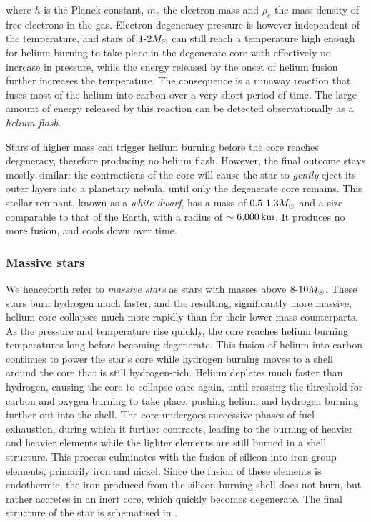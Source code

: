 where \(h\) is the Planck constant, \(m_e\) the electron mass and \(\rho_e\) the mass density of free electrons in the gas. Electron degeneracy pressure is however independent of the temperature, and stars of \(1\text{-}2M_{\odot}\) can still reach a temperature high enough for helium burning to take place in the degenerate core with effectively no increase in pressure, while the energy released by the onset of helium fusion further increases the temperature. The consequence is a runaway reaction that fuses most of the helium into carbon over a very short period of time. The large amount of energy released by this reaction can be detected observationally as a \emph{helium flash}.

Stars of higher mass can trigger helium burning before the core reaches degeneracy, therefore producing no helium flash. However, the final outcome stays mostly similar: the contractions of the core will cause the star to \emph{gently} eject its outer layers into a planetary nebula, until only the degenerate core remains. This stellar remnant, known as a \emph{white dwarf}, has a mass of \(0.5\text{-}1.3M_{\odot}\) and a size comparable to that of the Earth, with a radius of \(\sim6{,}000\,\mathrm{km}\). It produces no more fusion, and cools down over time.

\subsubsection{Massive stars} \label{sec:star_late_massive}

We henceforth refer to \emph{massive stars} as stars with masses above \(8\text{-}10M_{\odot}\). These stars burn hydrogen much faster, and the resulting, significantly more massive, helium core collapses much more rapidly than for their lower-mass counterparts. As the pressure and temperature rise quickly, the core reaches helium burning temperatures long before becoming degenerate. This fusion of helium into carbon continues to power the star's core while hydrogen burning moves to a shell around the core that is still hydrogen-rich. Helium depletes much faster than hydrogen, causing the core to collapse once again, until crossing the threshold for carbon and oxygen burning to take place, pushing helium and hydrogen burning further out into the shell. The core undergoes successive phases of fuel exhaustion, during which it further contracts, leading to the burning of heavier and heavier elements while the lighter elements are still burned in a shell structure. This process culminates with the fusion of silicon into iron-group elements, primarily iron and nickel. Since the fusion of these elements is endothermic, the iron produced from the silicon-burning shell does not burn, but rather accretes in an inert core, which quickly becomes degenerate. The final structure of the star is schematised in .

